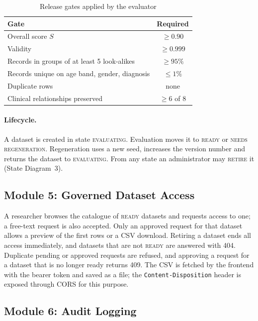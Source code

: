 \documentclass{tietreport}
\begin{document}
\begin{table}[H]
\centering
\small
\begin{tabular}{lc}
\toprule
\textbf{Gate} & \textbf{Required} \\
\midrule
Overall score $S$ & $\ge 0.90$ \\
Validity & $\ge 0.999$ \\
Records in groups of at least 5 look-alikes & $\ge 95\%$ \\
Records unique on age band, gender, diagnosis & $\le 1\%$ \\
Duplicate rows & none \\
Clinical relationships preserved & $\ge 6$ of 8 \\
\bottomrule
\end{tabular}
\caption{Release gates applied by the evaluator}
\label{tab:gates}
\end{table}

\paragraph{Lifecycle.} A dataset is created in state \textsc{evaluating}.
Evaluation moves it to \textsc{ready} or \textsc{needs regeneration}.
Regeneration uses a new seed, increases the version number and returns the
dataset to \textsc{evaluating}. From any state an administrator may
\textsc{retire} it (State Diagram~3).

\subsection{Module 5: Governed Dataset Access}

A researcher browses the catalogue of \textsc{ready} datasets and requests
access to one; a free-text request is also accepted. Only an approved request
for that dataset allows a preview of the first rows or a CSV download.
Retiring a dataset ends all access immediately, and datasets that are not
\textsc{ready} are answered with 404. Duplicate pending or approved requests
are refused, and approving a request for a dataset that is no longer ready
returns 409. The CSV is fetched by the frontend with the bearer token and
saved as a file; the \texttt{Content-Disposition} header is exposed through
CORS for this purpose.

\subsection{Module 6: Audit Logging}
\end{document}
